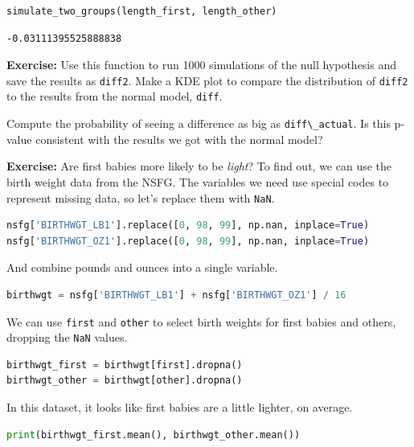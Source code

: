 \begin{lstlisting}[language=Python,style=source]
simulate_two_groups(length_first, length_other)
\end{lstlisting}

\begin{lstlisting}[style=output]
-0.03111395525888838
\end{lstlisting}

\textbf{Exercise:} Use this function to run 1000 simulations of the null
hypothesis and save the results as \passthrough{\lstinline!diff2!}. Make
a KDE plot to compare the distribution of
\passthrough{\lstinline!diff2!} to the results from the normal model,
\passthrough{\lstinline!diff!}.

Compute the probability of seeing a difference as big as
\passthrough{\lstinline!diff\_actual!}. Is this p-value consistent with
the results we got with the normal model?

\textbf{Exercise:} Are first babies more likely to be \emph{light}? To
find out, we can use the birth weight data from the NSFG. The variables
we need use special codes to represent missing data, so let's replace
them with \passthrough{\lstinline!NaN!}.

\begin{lstlisting}[language=Python,style=source]
nsfg['BIRTHWGT_LB1'].replace([0, 98, 99], np.nan, inplace=True)
nsfg['BIRTHWGT_OZ1'].replace([0, 98, 99], np.nan, inplace=True)
\end{lstlisting}

And combine pounds and ounces into a single variable.

\begin{lstlisting}[language=Python,style=source]
birthwgt = nsfg['BIRTHWGT_LB1'] + nsfg['BIRTHWGT_OZ1'] / 16
\end{lstlisting}

We can use \passthrough{\lstinline!first!} and
\passthrough{\lstinline!other!} to select birth weights for first babies
and others, dropping the \passthrough{\lstinline!NaN!} values.

\begin{lstlisting}[language=Python,style=source]
birthwgt_first = birthwgt[first].dropna()
birthwgt_other = birthwgt[other].dropna()
\end{lstlisting}

In this dataset, it looks like first babies are a little lighter, on
average.

\begin{lstlisting}[language=Python,style=source]
print(birthwgt_first.mean(), birthwgt_other.mean())
\end{lstlisting}

